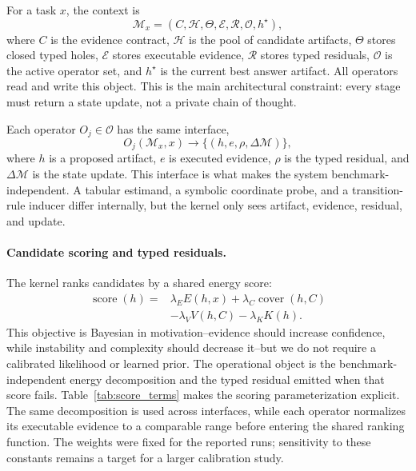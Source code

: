 \documentclass[letterpaper]{article}
\begin{document}
For a task $x$, the context is
\begin{equation}
  \mathcal{M}_x=(C,\mathcal{H},\Theta,\mathcal{E},
  \mathcal{R},\mathcal{O},h^\star),
\end{equation}
where $C$ is the evidence contract, $\mathcal{H}$ is the pool of candidate
artifacts, $\Theta$ stores closed typed holes, $\mathcal{E}$ stores executable
evidence, $\mathcal{R}$ stores typed residuals, $\mathcal{O}$ is the active
operator set, and $h^\star$ is the current best answer artifact. All operators
read and write this object. This is the main architectural constraint: every
stage must return a state update, not a private chain of thought.

Each operator $O_j\in\mathcal{O}$ has the same interface,
\begin{equation}
  O_j(\mathcal{M}_x,x) \rightarrow
  \{(h,e,\rho,\Delta\mathcal{M})\},
\end{equation}
where $h$ is a proposed artifact, $e$ is executed evidence, $\rho$ is the typed
residual, and $\Delta\mathcal{M}$ is the state update. This interface is what
makes the system benchmark-independent. A tabular estimand, a symbolic
coordinate probe, and a transition-rule inducer differ internally, but the
kernel only sees artifact, evidence, residual, and update.

\paragraph{Candidate scoring and typed residuals.}
The kernel ranks candidates by a shared energy score:
\begin{equation}
\begin{aligned}
  \operatorname{score}(h)
  ={}& \lambda_E E(h,x)
  + \lambda_C \operatorname{cover}(h,C) \\
  &- \lambda_V V(h,C)
  - \lambda_K K(h).
\end{aligned}
\end{equation}
This objective is Bayesian in motivation--evidence should increase confidence,
while instability and complexity should decrease it--but we do not require a
calibrated likelihood or learned prior. The operational object is the
benchmark-independent energy decomposition and the typed residual emitted when
that score fails. Table~\ref{tab:score_terms} makes the scoring
parameterization explicit. The same decomposition is used across interfaces,
while each operator normalizes its executable evidence to a comparable range
before entering the shared ranking function. The weights were fixed for the
reported runs; sensitivity to these constants remains a target for a larger
calibration study.
\end{document}
